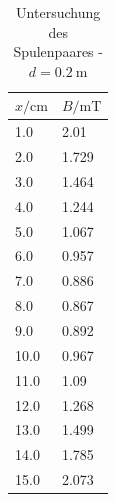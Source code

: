 \documentclass[11pt,ngerman,a4paper]{article}
\begin{document}
\begin{table}[H]
\centering
\begin{tabular}{ll}
\toprule
{$x / \si{\centi\meter}$} &{ $B/\si{\milli\tesla}$ }\\
\midrule
1.0 & 2.01\\
2.0 & 1.729\\
3.0 & 1.464\\
4.0 & 1.244\\
5.0 & 1.067\\
6.0 & 0.957\\
7.0 & 0.886\\
8.0 & 0.867\\
9.0 & 0.892\\
10.0 & 0.967\\
11.0 & 1.09\\
12.0 & 1.268\\
13.0 & 1.499\\
14.0 & 1.785\\
15.0 & 2.073\\
\bottomrule
\end{tabular}
\label{}
\caption{Untersuchung des Spulenpaares - $d =\SI{0.2}{\meter}$}
\end{table}
\end{document}
